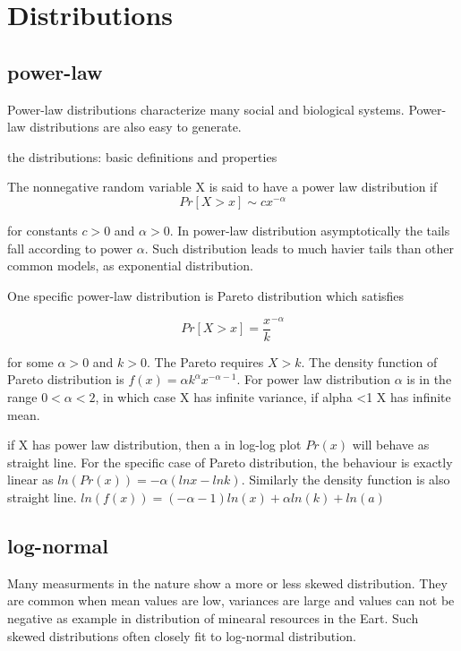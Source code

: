 \section{Distributions}

\subsection{power-law}
Power-law distributions characterize many social and biological systems. Power-law distributions are also easy to generate. 

the distributions: basic definitions and properties

The nonnegative random variable X is said to have a power law distribution if 
\begin{equation}
Pr[X>x] \sim c x ^{-\alpha}
\end{equation}

for constants $c>0$ and $\alpha >0$. In power-law distribution asymptotically the tails fall according to power $\alpha$. Such distribution leads to much havier tails than other common models, as exponential distribution. 

One specific power-law distribution is Pareto distribution which satisfies 

\begin{equation}
	Pr[X>x] = \frac{x}{k} ^{-\alpha}
\end{equation}

for some $\alpha>0$ and $k>0$. The Pareto requires $X>k$. The density function of Pareto distribution is $f(x)=\alpha k^\alpha x^{-\alpha-1}$. For power law distribution $\alpha$ is in the range $0 < \alpha < 2$, in which case X has infinite variance, if alpha <1 X has infinite mean.

if X has power law distribution, then a in log-log plot $Pr(x)$ will behave as straight line. For the specific case of Pareto distribution, the behaviour is exactly linear as $ln (Pr(x)) = -\alpha (lnx -ln k) $. Similarly the density function is also straight line. $ln(f(x)) = (-\alpha - 1) ln (x) + \alpha ln (k) + ln(a)$

\subsection{log-normal}
Many measurments in the nature show a more or less skewed distribution. They are common when mean values are low, variances are large and values can not be negative as example in distribution of minearal resources in the Eart. Such skewed distributions often closely fit to log-normal distribution. 

